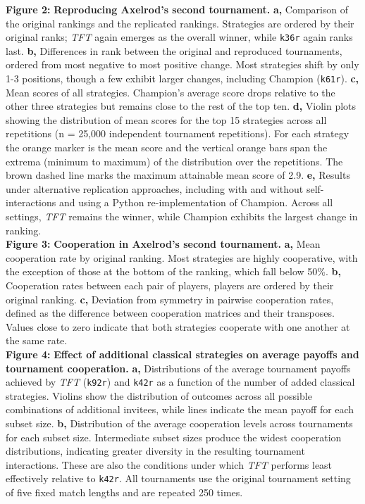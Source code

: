 \documentclass{article}
\newcommand{\TFT}{\emph{TFT}}
\begin{document}
\noindent
\textbf{Figure 2:} \textbf{Reproducing Axelrod's second tournament.}
\textbf{a,} Comparison of the original rankings and the replicated rankings.
Strategies are ordered by their original ranks; \TFT{} again
emerges as the overall winner, while \texttt{k36r} again ranks last.
\textbf{b,} Differences in rank between the original and reproduced tournaments,
ordered from most negative to most positive change. Most strategies shift by
only 1-3 positions, though a few exhibit larger changes, including Champion
(\texttt{k61r}).
\textbf{c,} Mean scores of all strategies. Champion's
average score drops relative to the other three strategies but remains close to
the rest of the top ten.
\textbf{d,} Violin plots showing the distribution of mean scores for the top 15
strategies across all repetitions (n = 25{,}000 independent tournament
repetitions). For each strategy the orange marker is the mean score and the
vertical orange bars span the extrema (minimum to maximum) of the distribution
over the repetitions. The brown dashed line marks the maximum attainable mean
score of 2.9.
\textbf{e,} Results under alternative replication approaches, including with and
without self-interactions and using a Python re-implementation of Champion.
Across all settings, \TFT{} remains the winner, while Champion exhibits the
largest change in ranking.\\

\noindent
\textbf{Figure 3:} \textbf{Cooperation in Axelrod's second tournament.}
\textbf{a,} Mean cooperation rate by original ranking. Most strategies are
highly cooperative, with the exception of those at the bottom of the ranking,
which fall below 50\%. \textbf{b,} Cooperation rates between each pair of
players, players are ordered by their original ranking. \textbf{c,} Deviation
from symmetry in pairwise cooperation rates, defined as the difference between
cooperation matrices and their transposes. Values close to zero indicate that
both strategies cooperate with one another at the same rate.\\

\noindent
\textbf{Figure 4:} \textbf{Effect of additional classical strategies on average payoffs and tournament cooperation.}
\textbf{a,} Distributions of the average tournament payoffs achieved by
\TFT{} (\texttt{k92r}) and \texttt{k42r} as a function of the number of added classical
strategies. Violins show the distribution of outcomes across all possible
combinations of additional invitees, while lines indicate the mean payoff
for each subset size. \textbf{b,} Distribution of the average cooperation
levels across tournaments for each subset size. Intermediate subset sizes
produce the widest cooperation distributions, indicating greater diversity
in the resulting tournament interactions. These are also the conditions
under which \TFT{} performs least effectively relative to \texttt{k42r}. All
tournaments use the original tournament setting of five fixed match lengths
and are repeated 250 times.\\
\end{document}

